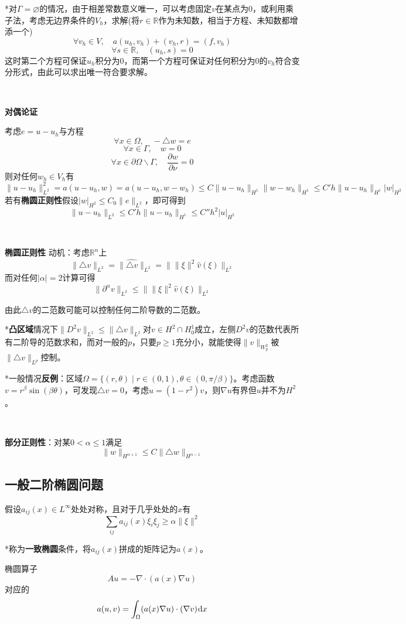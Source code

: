 \documentclass[a4paper,UTF8,fontset=windows]{ctexart}
\newcommand*{\dr}{\hspace{0.07em}\mathrm{d}}
\begin{document}
*对$\Gamma=\varnothing$的情况，由于相差常数意义唯一，可以考虑固定$v$在某点为0，或利用乘子法，考虑无边界条件的$V_h$，求解(将$r\in\mathbb{R}$作为未知数，相当于方程、未知数都增添一个)
$$\forall v_h\in V,\quad a(u_h,v_h)+(v_h,r)=(f,v_h)$$
$$\forall s\in\mathbb{R},\quad(u_h,s)=0$$
这时第二个方程可保证$u_h$积分为0，而第一个方程可保证对任何积分为0的$v_h$符合变分形式，由此可以求出唯一符合要求解。

\

\textbf{对偶论证}

考虑$e=u-u_h$与方程
$$\forall x\in\Omega,\quad-\triangle w=e$$
$$\forall x\in\Gamma,\quad w=0$$
$$\forall x\in\partial\Omega\backslash\Gamma,\quad\frac{\partial w}{\partial\nu}=0$$
则对任何$w_h\in V_h$有
$$\|u-u_h\|_{L^2}^2=a(u-u_h,w)=a(u-u_h,w-w_h)\le C\|u-u_h\|_{H^1}\|w-w_h\|_{H^1}\le C'h\|u-u_h\|_{H^1}|w|_{H^2}$$
若有\textbf{椭圆正则性}假设$|w|_{H^2}\le C_0\|e\|_{L^2}$，即可得到
$$\|u-u_h\|_{L^2}\le C'h\|u-u_h\|_{H^1}\le C''h^2|u|_{H^2}$$

\

\textbf{椭圆正则性}
动机：考虑$\mathbb{R}^n$上
$$\|\triangle v\|_{L^2}=\|\widehat{\triangle v}\|_{L^2}=\|\|\xi\|^2\hat{v}(\xi)\|_{L^2}$$
而对任何$|\alpha|=2$计算可得
$$\|\partial^\alpha v\|_{L^2}\le\|\|\xi\|^2\hat{v}(\xi)\|_{L^2}$$

由此$\triangle v$的二范数可能可以控制任何二阶导数的二范数。

*\textbf{凸区域}情况下$\|D^2v\|_{L^2}\le\|\triangle v\|_{L^2}$对$v\in H^2\cap H_0^1$成立，左侧$D^2v$的范数代表所有二阶导的范数求和，而对一般的$p$，只要$p\ge1$充分小，就能使得$\|v\|_{W_p^2}$被$\|\triangle v\|_{L^p}$控制。

*一般情况\textbf{反例}：区域$\Omega=\{(r,\theta)\mid r\in(0,1),\theta\in(0,\pi/\beta)\}$。考虑函数$v=r^\beta\sin(\beta\theta)$，可发现$\triangle v=0$，考虑$u=(1-r^2)v$，则$\nabla u$有界但$u$并不为$H^2$。

\

\textbf{部分正则性}：对某$0<\alpha\le1$满足
$$\|w\|_{H^{\alpha+1}}\le C\|\triangle w\|_{H^{\alpha-1}}$$

\subsection{一般二阶椭圆问题}
假设$a_{ij}(x)\in L^\infty$处处对称，且对于几乎处处的$x$有
$$\sum_{ij}a_{ij}(x)\xi_i\xi_j\ge\alpha\|\xi\|^2$$

*称为\textbf{一致椭圆}条件，将$a_{ij}(x)$拼成的矩阵记为$a(x)$。

椭圆算子
$$Au=-\nabla\cdot(a(x)\nabla u)$$
对应的
$$a(u,v)=\int_\Omega(a(x)\nabla u)\cdot(\nabla v)\dr x$$
\end{document}
